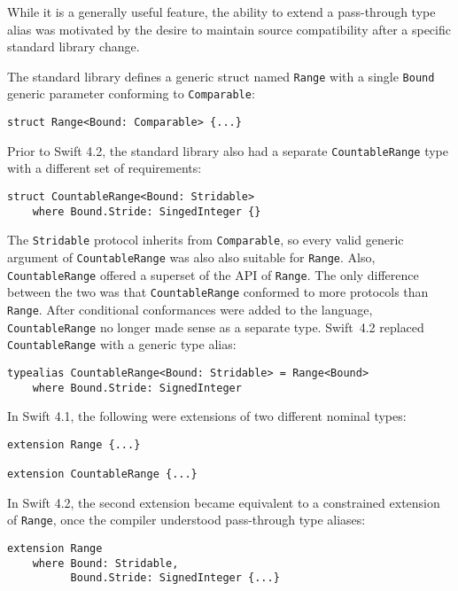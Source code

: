 \documentclass[../generics]{subfiles}
\begin{document}
\begin{example}
While it is a generally useful feature, the ability to extend a pass-through type alias was motivated by the desire to maintain source compatibility after a specific standard library change.

The standard library defines a generic struct named \texttt{Range} with a single \texttt{Bound} generic parameter conforming to \texttt{Comparable}:
\begin{Verbatim}
struct Range<Bound: Comparable> {...}
\end{Verbatim}
Prior to Swift 4.2, the standard library also had a separate \texttt{CountableRange} type with a different set of requirements:
\begin{Verbatim}
struct CountableRange<Bound: Stridable>
    where Bound.Stride: SingedInteger {}
\end{Verbatim}
The \texttt{Stridable} protocol inherits from \texttt{Comparable}, so every valid generic argument of \texttt{CountableRange} was also also suitable for \texttt{Range}. Also, \texttt{CountableRange} offered a superset of the API of \texttt{Range}. The only difference between the two was that \texttt{CountableRange} conformed to more protocols than \texttt{Range}. After conditional conformances were added to the language, \texttt{CountableRange} no longer made sense as a separate type. Swift~4.2 replaced \texttt{CountableRange} with a generic type alias:
\begin{Verbatim}
typealias CountableRange<Bound: Stridable> = Range<Bound>
    where Bound.Stride: SignedInteger
\end{Verbatim}
In Swift 4.1, the following were extensions of two different nominal types:
\begin{Verbatim}
extension Range {...}

extension CountableRange {...}
\end{Verbatim}
In Swift 4.2, the second extension became equivalent to a constrained extension of \texttt{Range}, once the compiler understood pass-through type aliases:
\begin{Verbatim}
extension Range
    where Bound: Stridable,
          Bound.Stride: SignedInteger {...}
\end{Verbatim}
\end{example}
\end{document}
